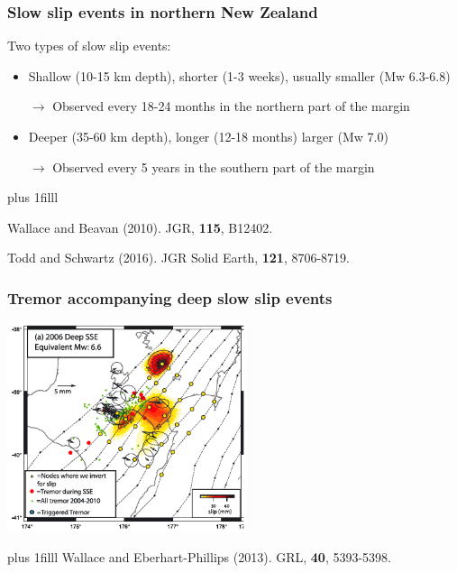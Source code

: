 \documentclass{beamer}
\newcommand{\btVFill}{\vskip0pt plus 1filll}
\begin{document}
	\begin{frame}
		\frametitle{Slow slip events in northern New Zealand}

		\vspace{2em}

		Two types of slow slip events:
		\begin{itemize}
			\item  Shallow (10-15 km depth), shorter (1-3 weeks), usually smaller (Mw 6.3-6.8)

			$\rightarrow$ Observed every 18-24 months in the northern part of the margin

			\item Deeper (35-60 km depth), longer (12-18 months) larger (Mw 7.0)

			$\rightarrow$ Observed every 5 years in the southern part of the margin
		\end{itemize}
		\btVFill
		\tiny{Wallace and Beavan (2010). JGR, \textbf{115}, B12402.

		Todd and Schwartz (2016). JGR Solid Earth, \textbf{121}, 8706-8719.}
	\end{frame}

	\begin{frame}
		\frametitle{Tremor accompanying deep slow slip events}
		\begin{center}
			\includegraphics[trim={0cm 0cm 0cm 0cm}, clip, width=7cm]{articles/wallace_eberhart-phillips_2013_3a.png}
		\end{center}
		\btVFill
		\tiny{Wallace and Eberhart-Phillips (2013). GRL, \textbf{40}, 5393-5398.}
	\end{frame}
\end{document}
